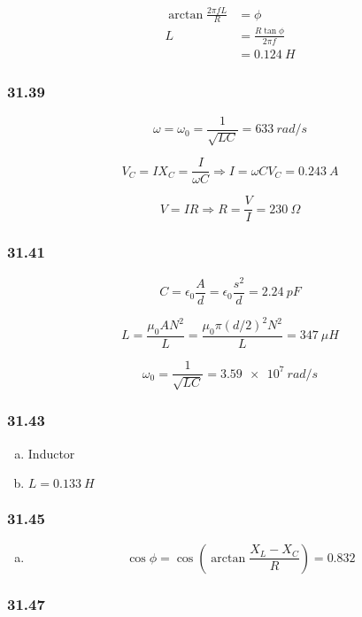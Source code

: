 \documentclass{article}
\begin{document}
\begin{align*}
  \arctan \frac{2 \pi f L}{R} & = \phi                        \\
  L                           & = \frac{R \tan \phi}{2 \pi f} \\
                              & = \qty{0.124}{H}
\end{align*}

\subsubsection{31.39}

\[\omega = \omega_0 = \frac{1}{\sqrt{L C}} = \qty{633}{rad/s}\]

\[V_C = I X_C = \frac{I}{\omega C} \Rightarrow I = \omega C V_C = \qty{0.243}{A}\]

\[V = I R \Rightarrow R = \frac{V}{I} = \qty{230}{\Omega}\]

\subsubsection{31.41}

\[C = \epsilon_0 \frac{A}{d} = \epsilon_0 \frac{s^2}{d} = \qty{2.24}{pF}\]

\[L = \frac{\mu_0 A N^2}{L} = \frac{\mu_0 \pi (d / 2)^2 N^2}{L} = \qty{347}{\mu H}\]

\[\omega_0 = \frac{1}{\sqrt{L C}} = \qty{3.59e7}{rad/s}\]

\subsubsection{31.43}

\begin{enumerate}[(a)]
  \item Inductor

  \item $L = \qty{0.133}{H}$
\end{enumerate}

\subsubsection{31.45}

\begin{enumerate}[(a)]
  \item \[\cos \phi = \cos \left( \arctan \frac{X_L - X_C}{R} \right) = 0.832\]
\end{enumerate}

\subsubsection{31.47}
\end{document}

